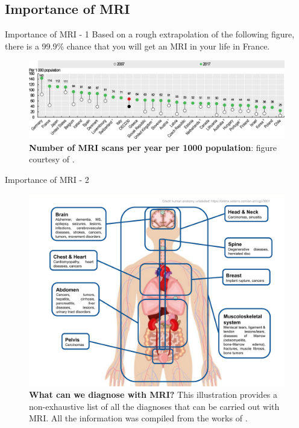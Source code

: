 \documentclass[aspectratio=169,xcolor=dvipsnames]{beamer}
\begin{document}
\subsection{Importance of MRI}
\begin{frame}{Importance of MRI - 1}
    Based on a rough extrapolation of the following figure, there is a 99.9\% chance that you will get an MRI in your life in France.
    \begin{figure}
        \centering
        \includegraphics[width=\textwidth]{Figures/intro_figures/num_mri_scans.png}
        \caption{\label{fig:num-mri-scans} \textbf{Number of MRI scans per year per 1000 population}: figure courtesy of \citet{OECDMRI}.}
    \end{figure}
\end{frame}

\begin{frame}{Importance of MRI - 2}
    \begin{figure}
        \centering
        \includegraphics[height=0.6\textheight]{Figures/intro_figures/What_can_we_diagnose_with_MRI.pdf}
        \caption{\label{fig:diagnose-mri} \textbf{What can we diagnose with MRI?} This illustration provides a non-exhaustive list of all the diagnoses that can be carried out with MRI. All the information was compiled from the works of \citet{reimer2010clinical,runge2019essentials}.}
    \end{figure}
\end{frame}
\end{document}
